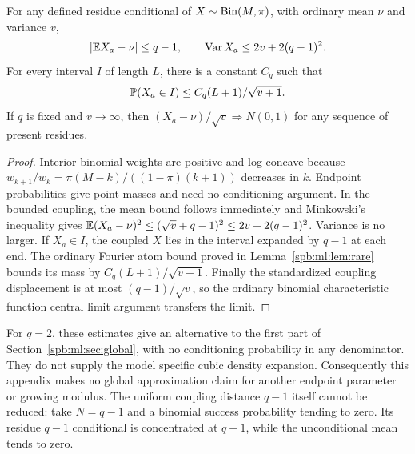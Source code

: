 \begin{corollary}\label{spb:ml:cor:coupling}
For any defined residue conditional of $X\sim\operatorname{Bin}(M,\pi)$, with ordinary mean $\nu$ and variance $v$,
\[
 |\mathbb E X_a-\nu|\le q-1,\qquad
 \operatorname{Var} X_a\le2v+2(q-1)^2.
\]
For every interval $I$ of length $L$, there is a constant $C_q$ such that
\[
 \mathbb P(X_a\in I)\le C_q(L+1)/\sqrt{v+1}.
\]
If $q$ is fixed and $v\to\infty$, then $(X_a-\nu)/\sqrt v\Longrightarrow N(0,1)$ for any sequence of present residues.
\end{corollary}
\begin{proof}
Interior binomial weights are positive and log concave because
$w_{k+1}/w_k=\pi(M-k)/((1-\pi)(k+1))$ decreases in $k$. Endpoint probabilities give point masses and need no conditioning argument. In the bounded coupling, the mean bound follows immediately and Minkowski's inequality gives
$\mathbb E(X_a-\nu)^2\le(\sqrt v+q-1)^2\le2v+2(q-1)^2$. Variance is no larger. If $X_a\in I$, the coupled $X$ lies in the interval expanded by $q-1$ at each end. The ordinary Fourier atom bound proved in Lemma~\ref{spb:ml:lem:rare} bounds its mass by $C_q(L+1)/\sqrt{v+1}$. Finally the standardized coupling displacement is at most $(q-1)/\sqrt v$, so the ordinary binomial characteristic function central limit argument transfers the limit.
\end{proof}

For $q=2$, these estimates give an alternative to the first part of Section~\ref{spb:ml:sec:global}, with no conditioning probability in any denominator. They do not supply the model specific cubic density expansion. Consequently this appendix makes no global approximation claim for another endpoint parameter or growing modulus. The uniform coupling distance $q-1$ itself cannot be reduced: take $N=q-1$ and a binomial success probability tending to zero. Its residue $q-1$ conditional is concentrated at $q-1$, while the unconditional mean tends to zero.
